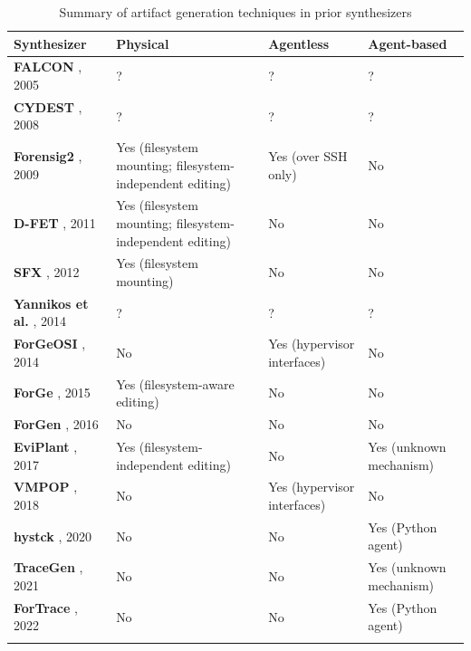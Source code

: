 \documentclass[final,5p,times,twocolumn]{elsarticle}
\begin{document}
\begin{table}[tb]
\footnotesize
\centering
\begin{tabularx}{\linewidth}{L{0.2} L{0.2666} L{0.2666} L{0.2666}}
\toprule
  \textbf{Synthesizer} & \textbf{Physical} & \textbf{Agentless} & \textbf{Agent-based} \\
\midrule
  \textbf{FALCON} \cite{adelsteinAutomaticallyCreatingRealistic2005},
  2005 & ? & ? & ? \\
  \textbf{CYDEST} \cite{bruecknerAutomatedComputerForensics2008}, 2008
  & ? & ? & ? \\
  \textbf{Forensig2}
  \cite{mochForensicImageGenerator2009,mochEvaluatingForensicImage2012},
  2009 & Yes (filesystem mounting; filesystem-independent editing) & Yes
  (over SSH only) & No \\
  \textbf{D-FET} \cite{williamCloudbasedDigitalForensics2011}, 2011 &
  Yes (filesystem mounting; filesystem-independent editing) & No & No \\
  \textbf{SFX} \cite{russellForensicImageDescription2012}, 2012 & Yes
  (filesystem mounting) & No & No \\
  \textbf{Yannikos et al.} \cite{yannikosDataCorporaDigital2014}, 2014
  & ? & ? & ? \\
  \textbf{ForGeOSI} \cite{maxfraggMaxfraggForGeOSI2023}, 2014 & No &
  Yes (hypervisor interfaces) & No \\
  \textbf{ForGe} \cite{vistiAutomaticCreationComputer2015}, 2015 & Yes
  (filesystem-aware editing) & No & No \\
  \textbf{ForGen} \cite{jjk422Jjk422ForGen2019}, 2016 & No & No &
  No \\
  \textbf{EviPlant} \cite{scanlonEviPlantEfficientDigital2017}, 2017 &
  Yes (filesystem-independent editing) & No & Yes (unknown mechanism) \\
  \textbf{VMPOP} \cite{parkTREDEVMPOPCultivating2018}, 2018 & No & Yes
  (hypervisor interfaces) & No \\
  \textbf{hystck} \cite{gobelNovelApproachGenerating2020}, 2020 & No &
  No & Yes (Python agent) \\
  \textbf{TraceGen} \cite{duTraceGenUserActivity2021}, 2021 & No & No
  & Yes (unknown mechanism) \\
  \textbf{ForTrace} \cite{gobelForTraceHolisticForensic2022}, 2022 &
  No & No & Yes (Python agent) \\ \\
\bottomrule
\end{tabularx}
\caption{Summary of artifact generation techniques in prior synthesizers}\label{tbl:prior-techniques}
\end{table}
\end{document}
